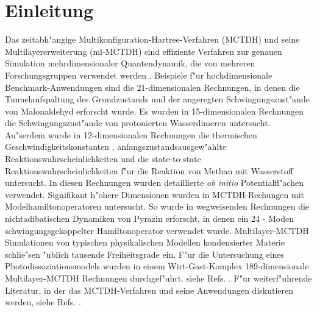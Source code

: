 \chapter{Einleitung}
\label{ch:einleitung}

Das zeitabh"angige Multikonfiguration-Hartree-Verfahren (MCTDH) 
\cite{MMC, MMC1} und seine Multilayererweiterung (ml-MCTDH)
\cite{WT3, Mreview2} 
sind effiziente Verfahren zur genauen Simulation mehrdimensionaler Quantendynamik,
die von mehreren Forschungsgruppen verwendet werden 
\cite{MCTDHex1, WestPNM, MCTDHex2, W1, MCTDHex4, MCTDHex5, MCTDHex6, MCTDHex7, MCTDHex8,
MCTDHex9, MCTDHex10, MCTDHex11, MCTDHex12, MCTDHex13, MCTDHex14, MCTDHex15, MCTDHex16, MCTDHex17,MCTDHex18}. 
Beispiele f"ur hochdimensionale 
Benchmark-Anwendungen sind die 21-dimen\-sio\-nalen Rechnungen, in denen die Tunnelaufspaltung des
Grundzustands \cite{CVM, HCVM, HaM1, MAMCTDH, HaM2, MAMCTDH2} und der angeregten \cite{HCVM, HaM1, MAMCTDH, HaM2, MAMCTDH2}
Schwingungszust"ande von Malonaldehyd erforscht wurde. 
Es wurden in 15-dimen\-sio\-nalen Rechnungen die Schwingungszust"ande von protonierten 
Wasserdi\-meren  \cite{H5O2+MCTDH, H5O2+MCTDH2, H5O2+MCTDH3, H5O2+MCTDH4, H5O2+MCTDH5} untersucht. 
Au"serdem wurde in 12-dimensionalen Rechnungen die thermischen 
Geschwindig\-keitskonstanten \cite{HM1, HM2, WWM, SM, vHNM,NvHM}, anfangszustandsausgew"ahlte Reaktionswahr\-scheinlichkeiten
\cite{SM02, SM04, WeM5, WeM6, WeM8} und die 
state-to-state Reaktionswahrscheinlichkeiten \cite{WeM7} f"ur die Reaktion von Methan mit Wasserstoff 
untersucht. In diesen Rechnungen wurden detaillierte \textit{ab initio} 
Potentialfl"achen verwendet. Signifikant h"ohere Dimensionen wurden in MCTDH-Rechungen mit 
Modelhamiltonoperatoren untersucht. So wurde in wegweisenden Rechnungen  
die nichtadibatischen Dynamiken von Pyrazin erforscht, in denen ein 24 - Moden 
schwingungsgekoppelter Hamiltonoperator \cite{WMC, WMC2, RWMC} verwendet wurde.
Multilayer-MCTDH Simulationen von typischen
physikalischen Modellen \cite{WT3, W1, WST, KCBWT, CTW2, WPHT} kondensierter Materie schlie"sen "ublich tausende Freiheitsgrade ein.
F"ur die Untersuchung eines Photodissoziationsmodels wurden in einem Wirt-Gast-Komplex 189-dimensionale 
Multilayer-MCTDH Rechnungen  durchgef"uhrt\cite{WBRSM}. 
siehe Refs. \cite{MCTDHreview, MCTDHreview2, HMreview1, MCTDHbook,Mreview2011, MCTDHreview3}.
F"ur weiterf"uhrende Literatur, in der das MCTDH-Verfahren und seine Anwendungen diskutieren
werden, siehe Refs. \cite{MCTDHreview, MCTDHreview2, HMreview1, MCTDHbook,Mreview2011, MCTDHreview3}.

